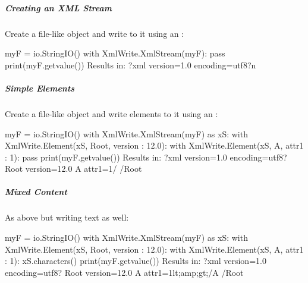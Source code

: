 \documentclass[letterpaper,10pt,english]{sphinxmanual}
\begin{document}
\subparagraph{Creating an XML Stream}
\label{\detokenize{ref/util/XmlWrite:creating-an-xml-stream}}
Create a file-like object and write to it using an :

\begin{sphinxVerbatim}[commandchars=\\\{\}]
myF = io.StringIO()
with XmlWrite.XmlStream(myF):
    pass
print(myF.getvalue())
\PYGZsh{} Results in:
\PYGZlt{}?xml version=\PYGZsq{}1.0\PYGZsq{} encoding=\PYGZdq{}utf\PYGZhy{}8\PYGZdq{}?\PYGZgt{}\PYGZbs{}n
\end{sphinxVerbatim}


\subparagraph{Simple Elements}
\label{\detokenize{ref/util/XmlWrite:simple-elements}}
Create a file-like object and write elements to it using an :

\begin{sphinxVerbatim}[commandchars=\\\{\}]
myF = io.StringIO()
with XmlWrite.XmlStream(myF) as xS:
    with XmlWrite.Element(xS, \PYGZsq{}Root\PYGZsq{}, \PYGZob{}\PYGZsq{}version\PYGZsq{} : \PYGZsq{}12.0\PYGZsq{}\PYGZcb{}):
        with XmlWrite.Element(xS, \PYGZsq{}A\PYGZsq{}, \PYGZob{}\PYGZsq{}attr\PYGZus{}1\PYGZsq{} : \PYGZsq{}1\PYGZsq{}\PYGZcb{}):
            pass
print(myF.getvalue())
\PYGZsh{} Results in:
\PYGZlt{}?xml version=\PYGZsq{}1.0\PYGZsq{} encoding=\PYGZdq{}utf\PYGZhy{}8\PYGZdq{}?\PYGZgt{}
\PYGZlt{}Root version=\PYGZdq{}12.0\PYGZdq{}\PYGZgt{}
    \PYGZlt{}A attr\PYGZus{}1=\PYGZdq{}1\PYGZdq{}/\PYGZgt{}
\PYGZlt{}/Root\PYGZgt{}
\end{sphinxVerbatim}


\subparagraph{Mixed Content}
\label{\detokenize{ref/util/XmlWrite:mixed-content}}
As above but writing text as well:

\begin{sphinxVerbatim}[commandchars=\\\{\}]
myF = io.StringIO()
with XmlWrite.XmlStream(myF) as xS:
    with XmlWrite.Element(xS, \PYGZsq{}Root\PYGZsq{}, \PYGZob{}\PYGZsq{}version\PYGZsq{} : \PYGZsq{}12.0\PYGZsq{}\PYGZcb{}):
        with XmlWrite.Element(xS, \PYGZsq{}A\PYGZsq{}, \PYGZob{}\PYGZsq{}attr\PYGZus{}1\PYGZsq{} : \PYGZsq{}1\PYGZsq{}\PYGZcb{}):
            xS.characters(\PYGZsq{}\PYGZlt{}\PYGZam{}\PYGZgt{}\PYGZsq{})
print(myF.getvalue())
\PYGZsh{} Results in:
\PYGZlt{}?xml version=\PYGZsq{}1.0\PYGZsq{} encoding=\PYGZdq{}utf\PYGZhy{}8\PYGZdq{}?\PYGZgt{}
\PYGZlt{}Root version=\PYGZdq{}12.0\PYGZdq{}\PYGZgt{}
    \PYGZlt{}A attr\PYGZus{}1=\PYGZdq{}1\PYGZdq{}\PYGZgt{}\PYGZam{}lt;\PYGZam{}amp;\PYGZam{}gt;\PYGZlt{}/A\PYGZgt{}
\PYGZlt{}/Root\PYGZgt{}
\end{sphinxVerbatim}
\end{document}
